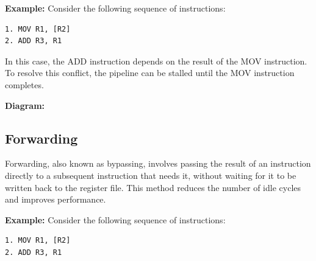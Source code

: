 \documentclass{report}
\begin{document}
\textbf{Example:}
Consider the following sequence of instructions:
\begin{verbatim}
1. MOV R1, [R2]
2. ADD R3, R1
\end{verbatim}

In this case, the ADD instruction depends on the result of the MOV instruction. To resolve this conflict, the pipeline can be stalled until the MOV instruction completes.

\textbf{Diagram:}
\begin{center}
\end{center}

\subsection{Forwarding}

Forwarding, also known as bypassing, involves passing the result of an instruction directly to a subsequent instruction that needs it, without waiting for it to be written back to the register file. This method reduces the number of idle cycles and improves performance.

\textbf{Example:}
Consider the following sequence of instructions:
\begin{verbatim}
1. MOV R1, [R2]
2. ADD R3, R1
\end{verbatim}
\end{document}

